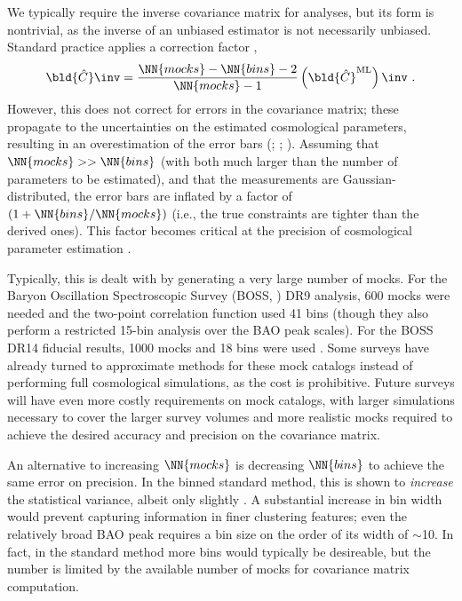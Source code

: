 We typically require the inverse covariance matrix for analyses, but its form is nontrivial, as the inverse of an unbiased estimator is not necessarily unbiased.
Standard practice applies a correction factor \citep{Hartlap2007},
\begin{equation}
\bld{\hat{C}}\inv = \frac{\NN{mocks}-\NN{bins}-2}{\NN{mocks}-1} \left( \bld{\hat{C}}^\mathrm{ML} \right) \inv ~.
\end{equation}
However, this does not correct for errors in the covariance matrix; these propagate to the uncertainties on the estimated cosmological parameters, resulting in an overestimation of the error bars (\citealt{Dodelson2013}; \citealt{Percival2014}; \citealt{TaylorJoachimi2014}).
Assuming that $\NN{mocks} >> \NN{bins}$ (with both much larger than the number of parameters to be estimated), and that the measurements are Gaussian-distributed, the error bars are inflated by a factor of $(1 + \NN{bins}/\NN{mocks})$ (i.e., the true constraints are tighter than the derived ones).
This factor becomes critical at the precision of cosmological parameter estimation \citep{Percival2014}.

Typically, this is dealt with by generating a very large number of mocks.
For the Baryon Oscillation Spectroscopic Survey (BOSS, \citealt{Dawson2013}) DR9 analysis, 600 mocks were needed and the two-point correlation function used 41 bins \citep{Sanchez2012} (though they also perform a restricted 15-bin analysis over the BAO peak scales). 
For the BOSS DR14 fiducial \cf results, 1000 mocks and 18 bins were used \citep{Ata2017}.
Some surveys have already turned to approximate methods for these mock catalogs instead of performing full cosmological simulations, as the cost is prohibitive.
Future surveys will have even more costly requirements on mock catalogs, with larger simulations necessary to cover the larger survey volumes and more realistic mocks required to achieve the desired accuracy and precision on the covariance matrix.

An alternative to increasing $\NN{mocks}$ is decreasing $\NN{bins}$ to achieve the same error on precision.
In the binned standard method, this is shown to \emph{increase} the statistical variance, albeit only slightly \citep{Percival2014}.
A substantial increase in bin width would prevent capturing information in finer clustering features; even the relatively broad BAO peak requires a bin size on the order of its width of $\sim$10\hmpc.
In fact, in the standard method more bins would typically be desireable, but the number is limited by the available number of mocks for covariance matrix computation.

